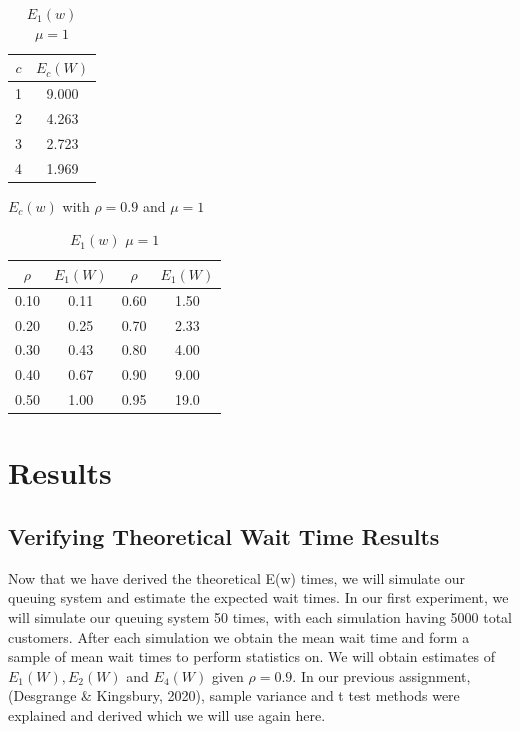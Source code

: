 \documentclass{article}
\begin{document}
    \begin{table}[h!]
        \parbox{.48\linewidth}{
        \centering
        \begin{tabular}{|c | c |}
            \hline
            $c$ & $E_c(W)$ \\
            \hline\hline
            1 & 9.000 \\
            2 & 4.263 \\
            3 & 2.723\\
            4 & 1.969 \\
            \hline
        \end{tabular}
        \caption{$E_c(w)$ with $\rho = 0.9$ and $\mu = 1$}
        \label{Table:ew_by_number_servers_theoretical_results}
        }
        \parbox{.48\linewidth}{
        \centering
        \begin{tabular}{|c | c || c | c |}
            \hline
            $\rho$ & $E_1(W)$ & $\rho$ & $E_1(W)$ \\
            \hline\hline
            0.10 & 0.11 & 0.60 & 1.50\\
            0.20 & 0.25 & 0.70 & 2.33 \\
            0.30 & 0.43 & 0.80 & 4.00 \\
            0.40 & 0.67 & 0.90 & 9.00 \\
            0.50 & 1.00 & 0.95 & 19.0 \\
            \hline
        \end{tabular}
        \caption{$E_1(w)$ $\mu = 1$}
        \label{Table:ew_by_rho_single_server_theoretical_results}
        }
    \end{table}

    \newpage

    \section{Results}
    \subsection*{Verifying Theoretical Wait Time Results}

    Now that we have derived the theoretical E(w) times, we will simulate our queuing system and estimate the expected wait times. In our first experiment, we will simulate our queuing system 50 times, with each simulation having 5000 total customers. After each simulation we obtain the mean wait time and form a sample of mean wait times to perform statistics on. We will obtain estimates of $E_1(W), E_2(W)$ and $E_4(W)$ given $\rho = 0.9$. In our previous assignment, (Desgrange \& Kingsbury, 2020), sample variance and t test methods were explained and derived which we will use again here.
\end{document}

